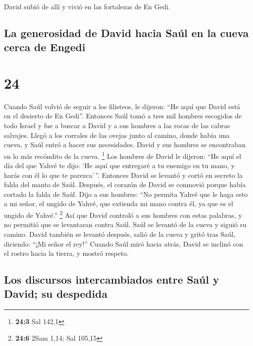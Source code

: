  David subió de allí y vivió en las fortalezas de En
Gedi.

\hypertarget{la-generosidad-de-david-hacia-sauxfal-en-la-cueva-cerca-de-engedi}{%
\subsection{La generosidad de David hacia Saúl en la cueva cerca de
Engedi}\label{la-generosidad-de-david-hacia-sauxfal-en-la-cueva-cerca-de-engedi}}

\hypertarget{section-23}{%
\section{24}\label{section-23}}

 Cuando Saúl volvió de seguir a los filisteos, le dijeron:
``He aquí que David está en el desierto de En Gedi''. 
Entonces Saúl tomó a tres mil hombres escogidos de todo Israel y fue a
buscar a David y a sus hombres a las rocas de las cabras salvajes.
 Llegó a los corrales de las ovejas junto al camino, donde
había una cueva, y Saúl entró a hacer sus necesidades. David y sus
hombres se encontraban en lo más recóndito de la cueva. \footnote{\textbf{24:3}
  Sal 142,1}  Los hombres de David le dijeron: ``He aquí
el día del que Yahvé te dijo: `He aquí que entregaré a tu enemigo en tu
mano, y harás con él lo que te parezca'\,''. Entonces David se levantó y
cortó en secreto la falda del manto de Saúl.  Después, el
corazón de David se conmovió porque había cortado la falda de Saúl.
 Dijo a sus hombres: ``No permita Yahvé que le haga esto a
mi señor, el ungido de Yahvé, que extienda mi mano contra él, ya que es
el ungido de Yahvé.'' \footnote{\textbf{24:6} 2Sam 1,14; Sal 105,15}
 Así que David controló a sus hombres con estas palabras,
y no permitió que se levantaran contra Saúl. Saúl se levantó de la cueva
y siguió su camino.  David también se levantó después,
salió de la cueva y gritó tras Saúl, diciendo: ``¡Mi señor el rey!''
Cuando Saúl miró hacia atrás, David se inclinó con el rostro hacia la
tierra, y mostró respeto.

\hypertarget{los-discursos-intercambiados-entre-sauxfal-y-david-su-despedida}{%
\subsection{Los discursos intercambiados entre Saúl y David; su
despedida}\label{los-discursos-intercambiados-entre-sauxfal-y-david-su-despedida}}

